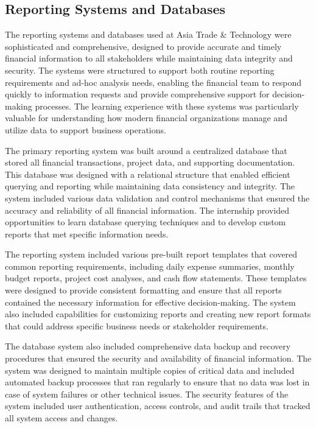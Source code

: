 \subsection{Reporting Systems and Databases}
The reporting systems and databases used at Asia Trade \& Technology were sophisticated and comprehensive, designed to provide accurate and timely financial information to all stakeholders while maintaining data integrity and security. The systems were structured to support both routine reporting requirements and ad-hoc analysis needs, enabling the financial team to respond quickly to information requests and provide comprehensive support for decision-making processes. The learning experience with these systems was particularly valuable for understanding how modern financial organizations manage and utilize data to support business operations.

The primary reporting system was built around a centralized database that stored all financial transactions, project data, and supporting documentation. This database was designed with a relational structure that enabled efficient querying and reporting while maintaining data consistency and integrity. The system included various data validation and control mechanisms that ensured the accuracy and reliability of all financial information. The internship provided opportunities to learn database querying techniques and to develop custom reports that met specific information needs.

The reporting system included various pre-built report templates that covered common reporting requirements, including daily expense summaries, monthly budget reports, project cost analyses, and cash flow statements. These templates were designed to provide consistent formatting and ensure that all reports contained the necessary information for effective decision-making. The system also included capabilities for customizing reports and creating new report formats that could address specific business needs or stakeholder requirements.

The database system also included comprehensive data backup and recovery procedures that ensured the security and availability of financial information. The system was designed to maintain multiple copies of critical data and included automated backup processes that ran regularly to ensure that no data was lost in case of system failures or other technical issues. The security features of the system included user authentication, access controls, and audit trails that tracked all system access and changes.

